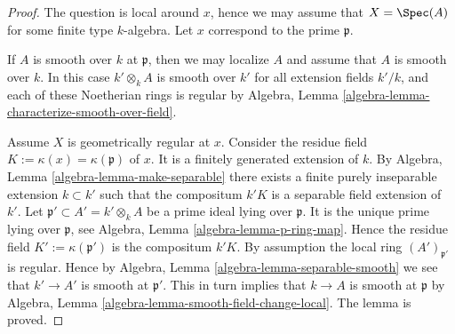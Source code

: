 \begin{proof}
The question is local around $x$,
hence we may assume that $X = \Spec(A)$
for some finite type $k$-algebra.
Let $x$ correspond to the prime $\mathfrak p$.

\medskip\noindent
If $A$ is smooth over $k$ at $\mathfrak p$, then we may localize $A$
and assume that $A$ is smooth over $k$. In this case $k' \otimes_k A$
is smooth over $k'$ for all extension fields $k'/k$, and each of
these Noetherian rings is regular by
Algebra, Lemma \ref{algebra-lemma-characterize-smooth-over-field}.

\medskip\noindent
Assume $X$ is geometrically regular at $x$.
Consider the residue field $K := \kappa(x) = \kappa(\mathfrak p)$ of $x$.
It is a finitely generated extension of $k$.
By Algebra, Lemma \ref{algebra-lemma-make-separable}
there exists a finite purely inseparable
extension $k \subset k'$ such that the compositum
$k'K$ is a separable field extension of $k'$.
Let $\mathfrak p' \subset A' = k' \otimes_k A$ be a prime ideal
lying over $\mathfrak p$. It is the unique prime lying over $\mathfrak p$, see
Algebra, Lemma \ref{algebra-lemma-p-ring-map}.
Hence the residue field $K' := \kappa(\mathfrak p')$
is the compositum $k'K$. By assumption the local ring
$(A')_{\mathfrak p'}$ is regular. Hence by
Algebra, Lemma \ref{algebra-lemma-separable-smooth}
we see that $k' \to A'$ is smooth at $\mathfrak p'$.
This in turn implies that $k \to A$ is smooth at $\mathfrak p$ by
Algebra, Lemma \ref{algebra-lemma-smooth-field-change-local}.
The lemma is proved.
\end{proof}


